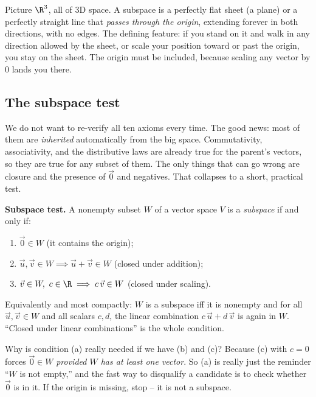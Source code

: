 \begin{intuitionbox}
Picture $\R^3$, all of $3$D space. A subspace is a perfectly flat sheet (a plane) or a
perfectly straight line that \emph{passes through the origin}, extending forever in both
directions, with no edges. The defining feature: if you stand on it and walk in any
direction allowed by the sheet, or scale your position toward or past the origin, you stay
on the sheet. The origin must be included, because scaling any vector by $0$ lands you
there.
\end{intuitionbox}

\subsection{The subspace test}

We do not want to re-verify all ten axioms every time. The good news: most of them are
\emph{inherited} automatically from the big space. Commutativity, associativity, and the
distributive laws are already true for the parent's vectors, so they are true for any
subset of them. The only things that can go wrong are closure and the presence of $\vec{0}$
and negatives. That collapses to a short, practical test.

\begin{formalbox}
\textbf{Subspace test.} A nonempty subset $W$ of a vector space $V$ is a \emph{subspace}
if and only if:
\begin{enumerate}[label=(\alph*)]
  \item $\vec{0} \in W$ \hfill (it contains the origin);
  \item $\vec{u},\vec{v}\in W \implies \vec{u}+\vec{v}\in W$ \hfill (closed under addition);
  \item $\vec{v}\in W,\ c\in\R \implies c\,\vec{v}\in W$ \hfill (closed under scaling).
\end{enumerate}
Equivalently and most compactly: $W$ is a subspace iff it is nonempty and for all
$\vec{u},\vec{v}\in W$ and all scalars $c,d$, the linear combination
$c\,\vec{u} + d\,\vec{v}$ is again in $W$. ``Closed under linear combinations'' is the
whole condition.
\end{formalbox}

Why is condition (a) really needed if we have (b) and (c)? Because (c) with $c = 0$ forces
$\vec{0}\in W$ \emph{provided $W$ has at least one vector}. So (a) is really just the
reminder ``$W$ is not empty,'' and the fast way to disqualify a candidate is to check
whether $\vec{0}$ is in it. If the origin is missing, stop -- it is not a subspace.

